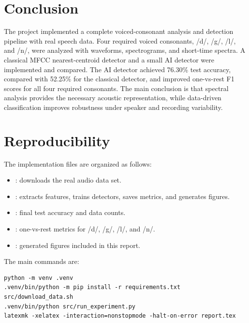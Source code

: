 \documentclass[11pt]{article}
\begin{document}
\section{Conclusion}

The project implemented a complete voiced-consonant analysis and detection pipeline with real speech data.  Four required voiced consonants, /d/, /g/, /l/, and /n/, were analyzed with waveforms, spectrograms, and short-time spectra.  A classical MFCC nearest-centroid detector and a small AI detector were implemented and compared.  The AI detector achieved 76.30\% test accuracy, compared with 52.25\% for the classical detector, and improved one-vs-rest F1 scores for all four required consonants.  The main conclusion is that spectral analysis provides the necessary acoustic representation, while data-driven classification improves robustness under speaker and recording variability.

\section*{Reproducibility}

The implementation files are organized as follows:
\begin{itemize}[nosep]
    \item {}: downloads the real audio data set.
    \item {}: extracts features, trains detectors, saves metrics, and generates figures.
    \item {}: final test accuracy and data counts.
    \item {}: one-vs-rest metrics for /d/, /g/, /l/, and /n/.
    \item {}: generated figures included in this report.
\end{itemize}

The main commands are:
\begin{lstlisting}
python -m venv .venv
.venv/bin/python -m pip install -r requirements.txt
src/download_data.sh
.venv/bin/python src/run_experiment.py
latexmk -xelatex -interaction=nonstopmode -halt-on-error report.tex
\end{lstlisting}
\end{document}
